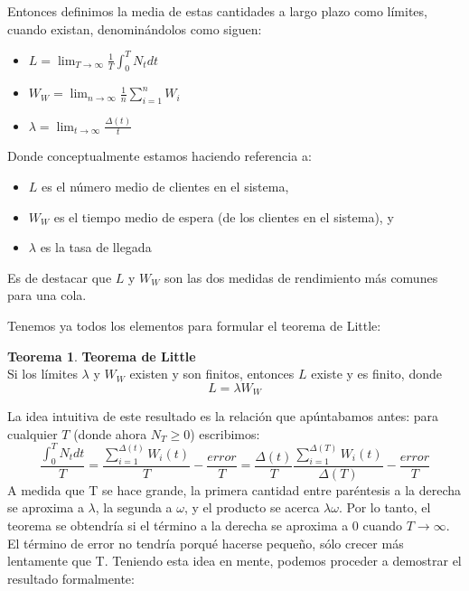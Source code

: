 \documentclass[a4paper,10pt]{scrartcl}
\theoremstyle{definition}
\newtheorem*{theorem*}{Teorema}
\numberwithin{equation}{section}
\begin{document}
	Entonces definimos la media de estas cantidades a largo plazo como límites, cuando existan, denominándolos
	como siguen:
	
	\begin{itemize}
		\item $L = \lim_{T\to \infty}\frac{1}{T} \int_{0}^{T} N_t dt$
		\item $W_W = \lim_{n\to \infty}\frac{1}{n} \sum_{i=1}^{n} W_i$
		\item $\lambda = \lim_{t\to \infty}\frac{\Delta(t)}{t}$
	\end{itemize}
	
	Donde conceptualmente estamos haciendo referencia a:
	\begin{itemize}
		\item $L$ es el número medio de clientes en el sistema,
		\item $W_W$ es el tiempo medio de espera (de los clientes en el sistema), y
		\item $\lambda$ es la tasa de llegada 
	\end{itemize}
	Es de destacar que  $L$ y $W_W$ son las dos medidas de rendimiento más comunes para una cola.
	
	
	Tenemos ya todos los elementos para formular el teorema de Little:
	\begin{theorem*}{\textbf{Teorema de Little}}\\
		Si los límites $\lambda$ y $W_W$ existen y son finitos, entonces $L$ existe y es finito, donde 
		\[L = \lambda W_W\]
		\label{little}
	\end{theorem*}
	
	La idea intuitiva de este resultado es la relación que apúntabamos antes: para cualquier $T$ (donde ahora $N_T \geq 0$) escribimos:
	\[ \frac{\int_{0}^{T} N_t dt}{T}=\frac{\sum_{i=1}^{\Delta (t)} W_i(t)}{T}-\frac{error}{T}=\frac{\Delta(t)}{T}\frac{\sum_{i=1}^{\Delta (T)} W_i(t)}{\Delta(T)}-\frac{error}{T}   \]
	A medida que T se hace grande, la primera cantidad entre paréntesis a la derecha se aproxima a $\lambda$, la segunda a $\omega$, 
	y el producto se acerca $\lambda\omega$. Por lo tanto, el teorema se obtendría si el término a la derecha 
	se aproxima a 0 cuando $T\rightarrow\infty$. El término de error no tendría porqué hacerse pequeño, 
	sólo crecer más lentamente que T.
	Teniendo esta idea en mente, podemos proceder a demostrar el resultado formalmente:
	
\end{document}
